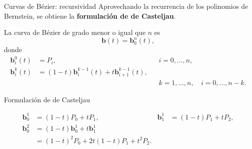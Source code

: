 \documentclass[main.tex]{subfiles}
\begin{document}
\begin{frame}[t]{Curvas de Bézier: recursividad}
Aprovechando la recurrencia de los polinomios de Bernstein, se obtiene la \textbf{formulación de de Casteljau}.\par\medskip La curva de Bézier de grado menor o igual que $n$ es\[\mathbf b(t)=\mathbf b_0^n(t),\]donde\[\begin{aligned}\mathbf b_i^0(t)&=P_i, &&i=0,\ldots,n,\\\mathbf b_i^k(t)&=(1-t)\mathbf b_i^{k-1}(t)+t\mathbf b_{i+1}^{k-1}(t),\\ &&&k=1,\ldots,n,\quad i=0,\ldots,n-k.\end{aligned}\]
\end{frame}

\begin{frame}[t]{Formulación de de Casteljau}
\begin{minipage}[t]{\textwidth}\begin{center}\end{center}\end{minipage}\small\[\begin{aligned}\mathbf b_0^1&=(1-t)P_0+tP_1,&\mathbf b_1^1&=(1-t)P_1+tP_2,\\\mathbf b_0^2&=(1-t)\mathbf b_0^1+t\mathbf b_1^1\\&=(1-t)^2P_0+2t(1-t)P_1+t^2P_2.\end{aligned}\]
\end{frame}
\end{document}
